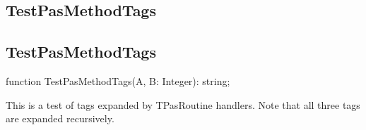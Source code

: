 \documentclass{report}
\newif\ifpdf
\begin{document}
\subsection*{\large{\textbf{TestPasMethodTags}}\normalsize\hspace{1ex}\hrulefill}
\else
\subsection*{TestPasMethodTags}
\fi
\label{ok_expanding_descriptions-TestPasMethodTags}
\begin{list}{}{
\setlength{\itemindent}{0cm}
\setlength{\listparindent}{0cm}
\setlength{\leftmargin}{\evensidemargin}
\addtolength{\leftmargin}{\tmplength}
\settowidth{\labelsep}{X}
\addtolength{\leftmargin}{\labelsep}
\setlength{\labelwidth}{\tmplength}
}
\item[\textbf{Declaration}\hfill]
\ifpdf
\begin{flushleft}
\fi
\begin{ttfamily}
function TestPasMethodTags(A, B: Integer): string;\end{ttfamily}

\ifpdf
\end{flushleft}
\fi

\par
\item[\textbf{Description}]
This is a test of tags expanded by TPasRoutine handlers. Note that all three tags are expanded recursively.

 




\end{list}
\end{document}
